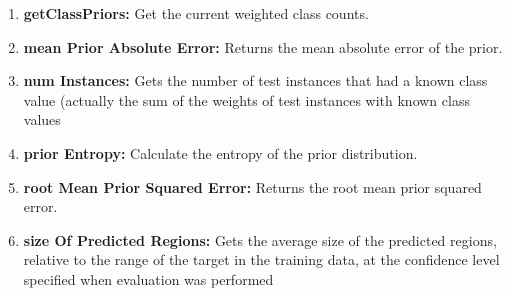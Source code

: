 \documentclass[a4paper,12pt, english]{article}
\begin{document}
\begin{enumerate}
                    

\item \textbf{getClassPriors: }
          Get the current weighted class counts.
          
          
          
          



          

          

          
\item \textbf{mean Prior Absolute Error: }
          Returns the mean absolute error of the prior.
          


\item \textbf{num Instances: }
          Gets the number of test instances that had a known class value (actually the sum of the weights of test instances with known class values

      
      



\item \textbf{prior Entropy: }
          Calculate the entropy of the prior distribution.    
                    
\item \textbf{root Mean Prior Squared Error: }
          Returns the root mean prior squared error.          
          
          
             
\item \textbf{size Of Predicted Regions: }
          Gets the average size of the predicted regions, relative to the range of the target in the training data, at the confidence level specified when evaluation was performed


\end{enumerate}
\end{document}
